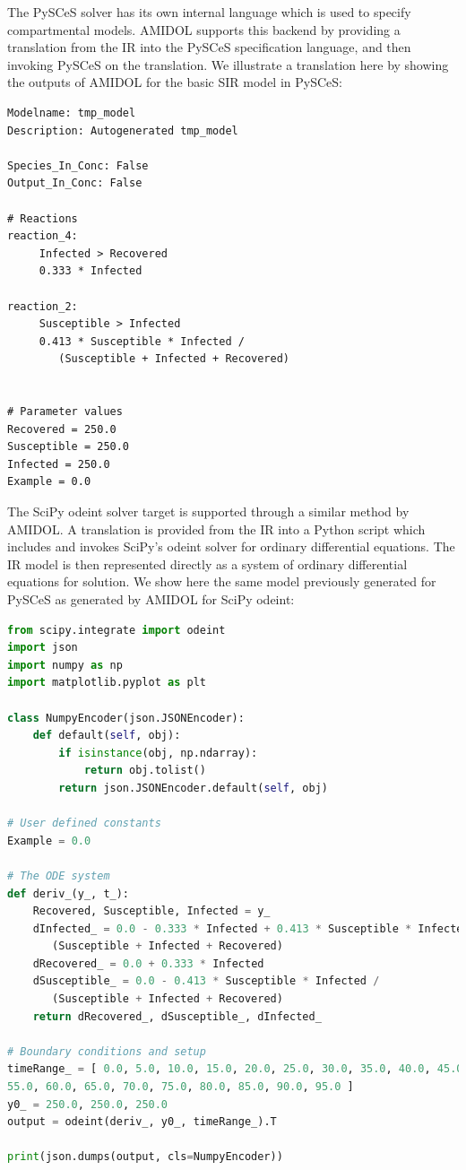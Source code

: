 \documentclass[11pt]{article}
\newcommand{\amidol}{\textsc{AMIDOL}}
\begin{document}
The PySCeS solver has its own internal language which is used to specify compartmental models.  \amidol{} supports this backend by providing a translation from the IR into the PySCeS specification language, and then invoking PySCeS on the translation.  We illustrate a translation here by showing the outputs of \amidol{} for the basic SIR model in PySCeS:

\begin{verbatim}
Modelname: tmp_model
Description: Autogenerated tmp_model

Species_In_Conc: False
Output_In_Conc: False

# Reactions
reaction_4:
     Infected > Recovered
     0.333 * Infected

reaction_2:
     Susceptible > Infected
     0.413 * Susceptible * Infected / 
        (Susceptible + Infected + Recovered)


# Parameter values
Recovered = 250.0
Susceptible = 250.0
Infected = 250.0
Example = 0.0
\end{verbatim}

The SciPy odeint solver target is supported through a similar method by \amidol{}.  A translation is provided from the IR into a Python script which includes and invokes SciPy's odeint solver for ordinary differential equations.  The IR model is then represented directly as a system of ordinary differential equations for solution.  We show here the same model previously generated for PySCeS as generated by \amidol{} for SciPy odeint:

\begin{lstlisting}[language=python]
from scipy.integrate import odeint
import json
import numpy as np
import matplotlib.pyplot as plt

class NumpyEncoder(json.JSONEncoder):
    def default(self, obj):
        if isinstance(obj, np.ndarray):
            return obj.tolist()
        return json.JSONEncoder.default(self, obj)

# User defined constants
Example = 0.0

# The ODE system
def deriv_(y_, t_):
    Recovered, Susceptible, Infected = y_
    dInfected_ = 0.0 - 0.333 * Infected + 0.413 * Susceptible * Infected /
       (Susceptible + Infected + Recovered)
    dRecovered_ = 0.0 + 0.333 * Infected
    dSusceptible_ = 0.0 - 0.413 * Susceptible * Infected /
       (Susceptible + Infected + Recovered)
    return dRecovered_, dSusceptible_, dInfected_

# Boundary conditions and setup
timeRange_ = [ 0.0, 5.0, 10.0, 15.0, 20.0, 25.0, 30.0, 35.0, 40.0, 45.0, 50.0,
55.0, 60.0, 65.0, 70.0, 75.0, 80.0, 85.0, 90.0, 95.0 ]
y0_ = 250.0, 250.0, 250.0
output = odeint(deriv_, y0_, timeRange_).T

print(json.dumps(output, cls=NumpyEncoder))
\end{lstlisting}
\end{document}

